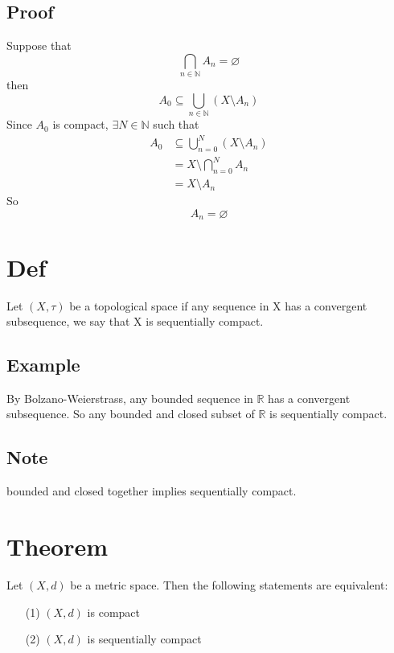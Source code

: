 \documentclass{book}
\begin{document}
\subsection*{Proof}
Suppose that $$\bigcap\limits_{n\in \mathbb{N}}A_n=\varnothing$$
then $$A_0\subseteq \bigcup\limits_{n\in \mathbb{N}}(X\setminus A_n)$$
Since $A_0$ is compact, $\exists N\in \mathbb{N}$ such that $$\begin{aligned}
    A_0 &\subseteq \bigcup\limits_{n=0}^N(X\setminus A_n)\\
    &= X\setminus \bigcap\limits_{n=0}^NA_n\\
    &= X\setminus A_n
\end{aligned}$$
So $$A_n=\varnothing$$

\section{Def}
Let $(X,\tau)$ be a topological space if any sequence in X has a convergent subsequence, we say that X is sequentially compact.
\subsection*{Example}
By Bolzano-Weierstrass, any bounded sequence in $\mathbb{R}$ has a convergent subsequence. So any bounded and closed subset of $\mathbb{R}$ is sequentially compact.
\subsection*{Note}
bounded and closed together implies sequentially compact.
\section{Theorem}
Let $(X,d)$ be a metric space. Then the following statements are equivalent:
\begin{itemize}
    \item[(1)] $(X,d)$ is compact
    \item[(2)] $(X,d)$ is sequentially compact
\end{itemize}
\end{document}
